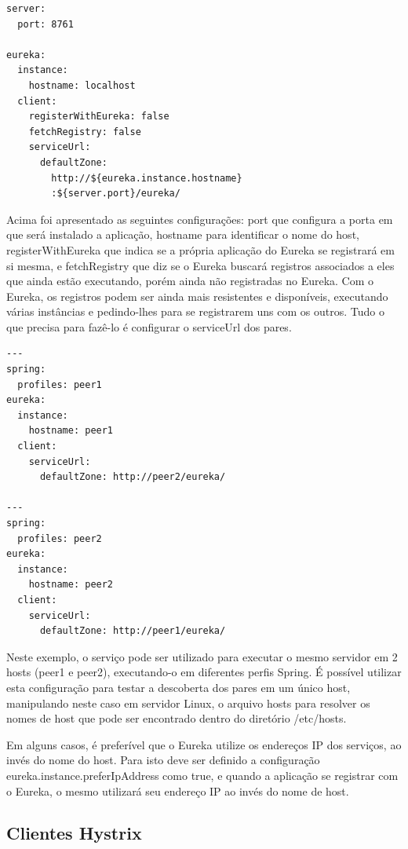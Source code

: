 \documentclass[journal]{IEEEtran}
\begin{document}
\begin{verbatim}
server:
  port: 8761

eureka:
  instance:
    hostname: localhost
  client:
    registerWithEureka: false
    fetchRegistry: false
    serviceUrl:
      defaultZone: 
        http://${eureka.instance.hostname}
        :${server.port}/eureka/
\end{verbatim}

Acima foi apresentado as seguintes configurações: port que configura a porta em que será instalado a aplicação, hostname para identificar o nome do host, registerWithEureka que indica se a própria aplicação do Eureka se registrará em si mesma, e fetchRegistry que diz se o Eureka buscará registros associados a eles que ainda estão executando, porém ainda não registradas no Eureka.
Com o Eureka, os registros podem ser ainda mais resistentes e disponíveis, executando várias instâncias e pedindo-lhes para se registrarem uns com os outros. Tudo o que precisa para fazê-lo é configurar o serviceUrl dos pares.

\begin{verbatim}
---
spring:
  profiles: peer1
eureka:
  instance:
    hostname: peer1
  client:
    serviceUrl:
      defaultZone: http://peer2/eureka/

---
spring:
  profiles: peer2
eureka:
  instance:
    hostname: peer2
  client:
    serviceUrl:
      defaultZone: http://peer1/eureka/
\end{verbatim}

Neste exemplo, o serviço pode ser utilizado para executar o mesmo servidor em 2 hosts (peer1 e peer2), executando-o em diferentes perfis Spring. É possível utilizar esta configuração para testar a descoberta dos pares em um único host, manipulando neste caso em servidor Linux, o arquivo hosts para resolver os nomes de host que pode ser encontrado dentro do diretório /etc/hosts.

Em alguns casos, é preferível que o Eureka utilize os endereços IP dos serviços, ao invés do nome do host. Para isto deve ser definido a configuração eureka.instance.preferIpAddress como true, e quando a aplicação se registrar com o Eureka, o mesmo utilizará seu endereço IP ao invés do nome de host.

\subsection{Clientes Hystrix}
\end{document}
